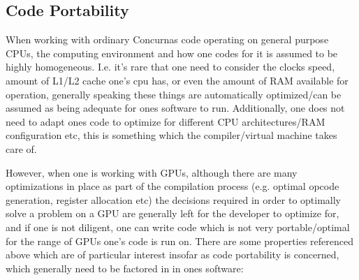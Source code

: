 \documentclass[conc-doc]{subfiles}
\begin{document}
\subsection{Code Portability}
When working with ordinary Concurnas code operating on general purpose CPUs, the computing environment and how one codes for it is assumed to be highly homogeneous. I.e. it's rare that one need to consider the clocks speed, amount of L1/L2 cache one's cpu has, or even the amount of RAM available for operation, generally speaking these things are automatically optimized/can be assumed as being adequate for ones software to run. Additionally, one does not need to adapt ones code to optimize for different CPU architectures/RAM configuration etc, this is something which the compiler/virtual machine takes care of. 

However, when one is working with GPUs, although there are many optimizations in place as part of the compilation process (e.g. optimal opcode generation, register allocation etc) the decisions required in order to optimally solve a problem on a GPU are generally left for the developer to optimize for, and if one is not diligent, one can write code which is not very portable/optimal for the range of GPUs one's code is run on. There are some properties referenced above which are of particular interest insofar as code portability is concerned, which generally need to be factored in in ones software:
\end{document}
